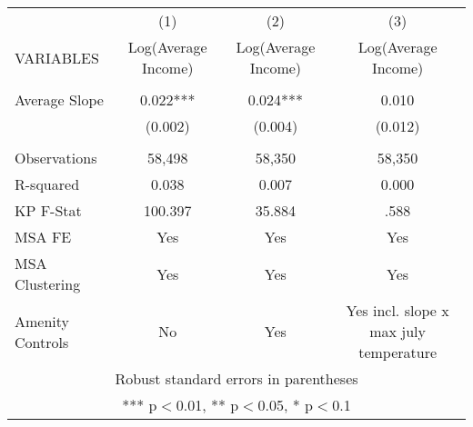 \begin{tabular}{lccc} \hline
 & (1) & (2) & (3) \\
VARIABLES & Log(Average Income) & Log(Average Income) & Log(Average Income) \\ \hline
 &  &  &  \\
Average Slope & 0.022*** & 0.024*** & 0.010 \\
 & (0.002) & (0.004) & (0.012) \\
 &  &  &  \\
Observations & 58,498 & 58,350 & 58,350 \\
R-squared & 0.038 & 0.007 & 0.000 \\
KP F-Stat & 100.397 & 35.884 & .588 \\
MSA FE & Yes & Yes & Yes \\
MSA Clustering & Yes & Yes & Yes \\
 Amenity Controls & No & Yes & Yes incl. slope x max july temperature \\ \hline
\multicolumn{4}{c}{ Robust standard errors in parentheses} \\
\multicolumn{4}{c}{ *** p$<$0.01, ** p$<$0.05, * p$<$0.1} \\
\end{tabular}
